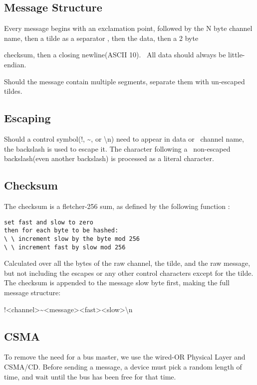 \documentclass{article}
\begin{document}
\subsection{Message Structure}
Every message begins with an exclamation point, followed by the N byte channel name, then a tilde as a separator , then the data, then a 2 byte 


\bigskip

checksum, then a closing newline(ASCII 10). \ All data should always be little-endian.

Should the message contain multiple segments, separate them with un-escaped tildes.

\subsection{Escaping}
Should a control symbol(!, \~{}, or {\textbackslash}n) need to appear in data or \ channel name, the backslash is used to escape it. The character following a \ non-escaped backslash(even another backslash) is processed as a literal character.

\subsection{Checksum}
The checksum is a fletcher-256 sum, as defined by the following function :

\begin{verbatim}
set fast and slow to zero
then for each byte to be hashed:
\ \ increment slow by the byte mod 256
\ \ increment fast by slow mod 256
\end{verbatim}

\bigskip

Calculated over all the bytes of the raw channel, the tilde, and the raw message, but not including the escapes or any other control characters except for the tilde. The checksum is appended to the message slow byte first, making the full message structure:

!{\textless}channel{\textgreater}\~{}{\textless}message{\textgreater}{\textless}fast{\textgreater}{\textless}slow{\textgreater}{\textbackslash}n

\subsection{CSMA}
To remove the need for a bus master, we use the wired-OR Physical Layer and CSMA/CD. Before sending a message, a device must pick a random length of time, and wait until the bus has been free for that time.
\end{document}
